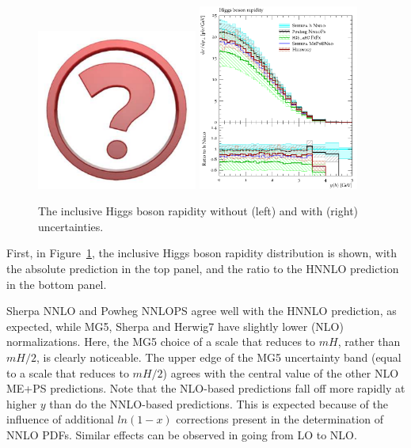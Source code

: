 \begin{figure}[t!]
  \centering
  \includegraphics[width=0.47\textwidth]{Micon.pdf}
  \hfill
  \includegraphics[width=0.47\textwidth]{figures/hjetscomp_H_y.pdf}
  \caption{
    The inclusive Higgs boson rapidity without (left) and with (right)
    uncertainties.
    \label{fig:higgscomp:results:inclobs:hy}
  }
\end{figure}

First, in Figure~\ref{fig:higgscomp:results:inclobs:hy}, the inclusive
Higgs boson rapidity distribution is shown, with the absolute
prediction in the top panel, and the ratio to the HNNLO prediction in
the bottom panel.


Sherpa NNLO and Powheg NNLOPS agree well with the HNNLO prediction, as
expected, while MG5, Sherpa and Herwig7 have slightly lower (NLO)
normalizations. Here, the MG5 choice of a scale that reduces to $mH$,
rather than $mH/2$, is clearly noticeable. The upper edge of the MG5
uncertainty band (equal to a scale that reduces to $mH/2$) agrees with
the central value of the other NLO ME+PS predictions. Note that the
NLO-based predictions fall off more rapidly at higher $y$ than do the
NNLO-based predictions. This is expected because of the influence of
additional $ln(1-x)$ corrections present in the determination of NNLO
PDFs.  Similar effects can be observed in going from LO to NLO.


